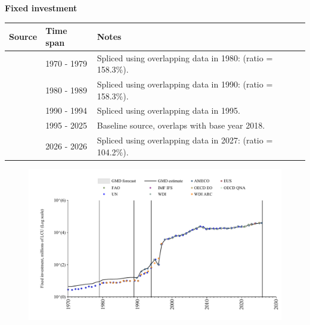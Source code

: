 \documentclass[12pt,a4paper,landscape]{article}
\begin{document}
\begin{adjustbox}{max totalsize={\paperwidth}{\paperheight},center}
\begin{minipage}[t][\textheight][t]{\textwidth}
\vspace*{0.5cm}
{}
\begin{center}
{\Large\bfseries Fixed investment}
\end{center}
\vspace{0.5cm}
\begin{table}[H]
\centering
\small
\begin{tabular}{|l|l|l|}
\hline
\textbf{Source} & \textbf{Time span} & \textbf{Notes} \\
\hline
\rowcolor{white}\cite{UN}& 1970 - 1979 &Spliced using overlapping data in 1980: (ratio = 158.3\%). \\
\rowcolor{lightgray}\cite{WDI}& 1980 - 1989 &Spliced using overlapping data in 1990: (ratio = 158.3\%). \\
\rowcolor{white}\cite{AMECO}& 1990 - 1994 &Spliced using overlapping data in 1995. \\
\rowcolor{lightgray}\cite{OECD_EO}& 1995 - 2025 &Baseline source, overlaps with base year 2018. \\
\rowcolor{white}\cite{AMECO}& 2026 - 2026 &Spliced using overlapping data in 2027: (ratio = 104.2\%). \\
\hline
\end{tabular}
\end{table}
\begin{figure}[H]
\centering
\includegraphics[width=\textwidth,height=0.6\textheight,keepaspectratio]{graphs/BGR_finv.pdf}
\end{figure}
\end{minipage}
\end{adjustbox}
\end{document}
